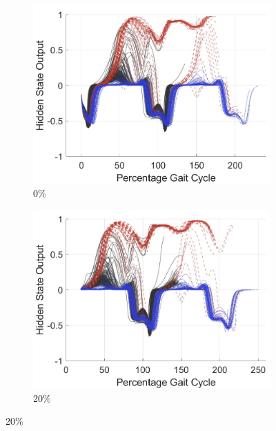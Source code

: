 \begin{figure}[!hbt]
     \centering
     \begin{subfigure}[H]{0.28\textwidth}
         \centering
         \includegraphics[width=\textwidth]{content/4-LSTM_Behaviour/results/hidden_state/gyro_y_sa_v_w-sd/0_Participant_04.jpg}
         \caption{0\%}
         \label{subfig:gyro_y_w_v_sa_sd_0}
     \end{subfigure}
     \begin{subfigure}[H]{0.28\textwidth}
         \centering
         \includegraphics[width=\textwidth]{content/4-LSTM_Behaviour/results/hidden_state/gyro_y_sa_v_w-sd/20_Participant_04.jpg}
         \caption{20\%}
         \label{subfig:gyro_y_w_v_sa_sd_20}
     \end{subfigure}

\end{figure}
